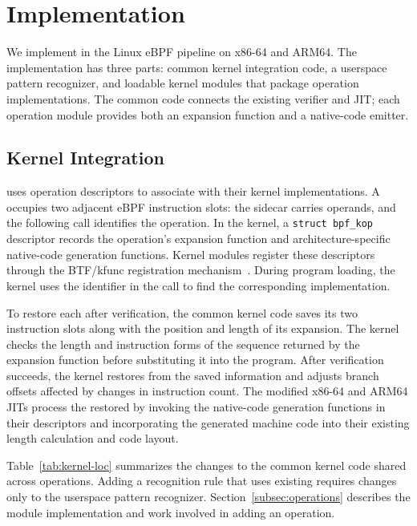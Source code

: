 \section{Implementation}
\label{sec:implementation}

We implement \tool in the Linux eBPF pipeline on x86-64 and ARM64. The implementation has three parts: common kernel integration code, a userspace pattern recognizer, and loadable kernel modules that package operation implementations. The common code connects the existing verifier and JIT; each operation module provides both an expansion function and a native-code emitter.

\subsection{Kernel Integration}
\label{subsec:kernel}

\tool uses operation descriptors to associate \kinsns with their kernel implementations. A \kinsn occupies two adjacent eBPF instruction slots: the sidecar carries operands, and the following call identifies the operation. In the kernel, a \texttt{struct bpf\_kop} descriptor records the operation's expansion function and architecture-specific native-code generation functions. Kernel modules register these descriptors through the BTF/kfunc registration mechanism~\cite{kfuncs}. During program loading, the kernel uses the identifier in the call to find the corresponding implementation.

To restore each \kinsn after verification, the common kernel code saves its two instruction slots along with the position and length of its expansion. The kernel checks the length and instruction forms of the sequence returned by the expansion function before substituting it into the program. After verification succeeds, the kernel restores \kinsns from the saved information and adjusts branch offsets affected by changes in instruction count. The modified x86-64 and ARM64 JITs process the restored \kinsns by invoking the native-code generation functions in their descriptors and incorporating the generated machine code into their existing length calculation and code layout.

Table~\ref{tab:kernel-loc} summarizes the changes to the common kernel code shared across operations. Adding a recognition rule that uses existing \kinsns requires changes only to the userspace pattern recognizer. Section~\ref{subsec:operations} describes the module implementation and work involved in adding an operation.

